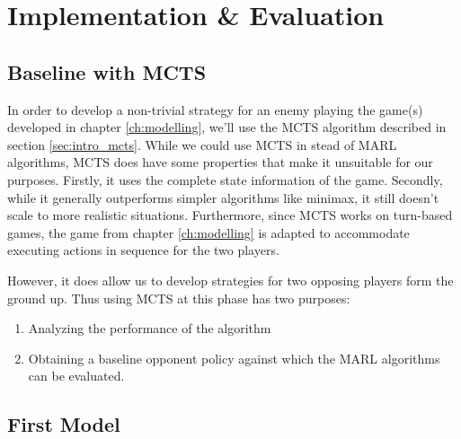 \chapter{Implementation \& Evaluation}
\label{ch:impl_eval}
\section{Baseline with MCTS}
In order to develop a non-trivial strategy for an enemy playing the game(s) developed in chapter \ref{ch:modelling}, we'll use  the MCTS algorithm described in section \ref{sec:intro_mcts}.
While we could use MCTS in stead of MARL algorithms, MCTS does have some properties that make it unsuitable for our purposes. Firstly, it uses the complete state information of the game. Secondly, while it generally outperforms simpler algorithms like minimax, it still doesn't scale to more realistic situations. Furthermore, since MCTS works on turn-based games, the game from chapter \ref{ch:modelling} is adapted to accommodate executing actions in sequence for the two players.

However, it does allow us to develop strategies for two opposing players form the ground up. Thus using MCTS at this phase has two purposes:
\begin{enumerate}
    \item Analyzing the performance of the algorithm
    \item Obtaining a baseline opponent policy against which the MARL algorithms can be evaluated.
\end{enumerate}



\section{First Model}
